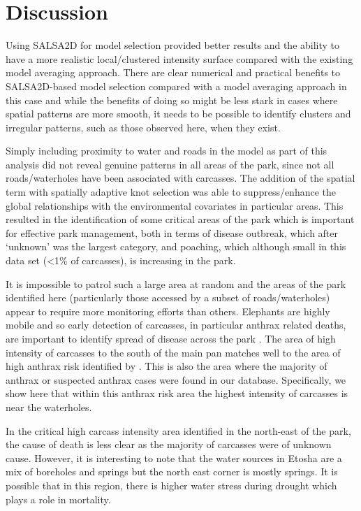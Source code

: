 \documentclass[letterpaper, 12pt]{interact}
\begin{document}
	\clearpage
	
	\section*{Discussion}\label{discussion}
	
	Using SALSA2D for model selection provided better results and the ability to have a more realistic local/clustered intensity surface compared with the existing model averaging approach. There are clear numerical and practical benefits to SALSA2D-based model selection compared with a model averaging approach in this case and while the benefits of doing so might be less stark in cases where spatial patterns are more smooth, it needs to be possible to identify clusters and irregular patterns, such as those observed here, when they exist. 
	
	Simply including proximity to water and roads in the model as part of this analysis did not reveal genuine patterns in all areas of the park, since not all roads/waterholes have been associated with carcasses. The addition of the spatial term with spatially adaptive knot selection was able to suppress/enhance the global relationships with the environmental covariates in particular areas. This resulted in the identification of some critical areas of the park which is important for effective park management, both in terms of disease outbreak, which after `unknown' was the largest category, and poaching, which although small in this data set (\textless{}1\% of carcasses), is increasing in the park. 
	
	It is impossible to patrol such a large area at random and the areas of the park identified here (particularly those accessed by a subset of roads/waterholes) appear to require more monitoring efforts than others. Elephants are highly mobile and so early detection of carcasses, in particular anthrax related deaths, are important to identify spread of disease across the park \cite{Lind1994}.  The area of high intensity of carcasses to the south of the main pan matches well to the area of high anthrax risk identified by \citet{dougherty2022}.  This is also the area where the majority of anthrax or suspected anthrax cases were found in our database. Specifically, we show here that within this anthrax risk area the highest intensity of carcasses is near the waterholes.  
	
	In the critical high carcass intensity area identified in the north-east of the park, the cause of death is less clear as the majority of carcasses were of unknown cause. However, it is interesting to note that the water sources in Etosha are a mix of boreholes and springs but the north east corner is mostly springs.  It is possible that in this region, there is higher water stress during drought which plays a role in mortality.
	
\end{document}
